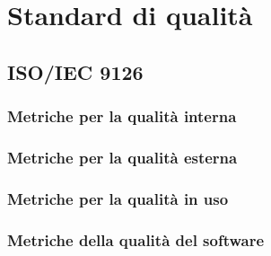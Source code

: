 \section{Standard di qualità}
\subsection{ISO/IEC 9126}
\subsubsection{Metriche per la qualità interna}
\subsubsection{Metriche per la qualità esterna}
\subsubsection{Metriche per la qualità in uso}
\subsubsection{Metriche della qualità del software}